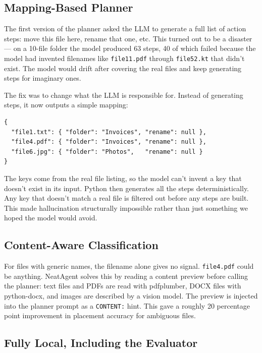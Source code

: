 \documentclass{article}
\begin{document}
\subsection{Mapping-Based Planner}

The first version of the planner asked the LLM to generate a full list of action steps: move this file here, rename that one, etc. This turned out to be a disaster — on a 10-file folder the model produced 63 steps, 40 of which failed because the model had invented filenames like \texttt{file11.pdf} through \texttt{file52.kt} that didn't exist. The model would drift after covering the real files and keep generating steps for imaginary ones.

The fix was to change what the LLM is responsible for. Instead of generating steps, it now outputs a simple mapping:

\begin{lstlisting}[language={}]
{
  "file1.txt": { "folder": "Invoices", "rename": null },
  "file4.pdf": { "folder": "Invoices", "rename": null },
  "file6.jpg": { "folder": "Photos",   "rename": null }
}
\end{lstlisting}

The keys come from the real file listing, so the model can't invent a key that doesn't exist in its input. Python then generates all the steps deterministically. Any key that doesn't match a real file is filtered out before any steps are built. This made hallucination structurally impossible rather than just something we hoped the model would avoid.

\subsection{Content-Aware Classification}

For files with generic names, the filename alone gives no signal. \texttt{file4.pdf} could be anything. NeatAgent solves this by reading a content preview before calling the planner: text files and PDFs are read with pdfplumber, DOCX files with python-docx, and images are described by a vision model. The preview is injected into the planner prompt as a \texttt{CONTENT:} hint. This gave a roughly 20 percentage point improvement in placement accuracy for ambiguous files.

\subsection{Fully Local, Including the Evaluator}
\end{document}
